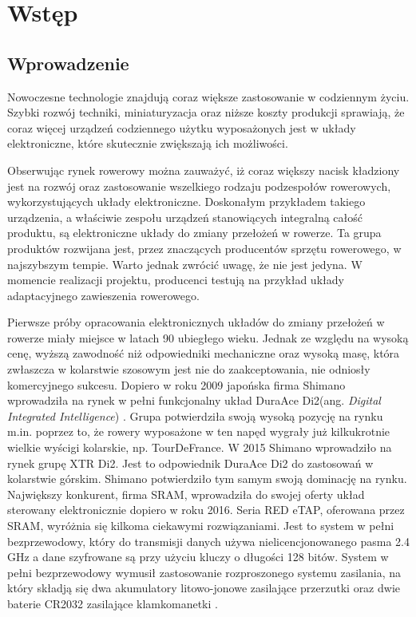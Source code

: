 \chapter{Wstęp}
\label{cha:Wstęp}

\section{Wprowadzenie}
\label{sec:Wprowadzenie}
Nowoczesne technologie znajdują coraz większe zastosowanie w codziennym życiu. Szybki rozwój techniki, miniaturyzacja oraz niższe koszty produkcji sprawiają, że coraz więcej urządzeń codziennego użytku wyposażonych jest w układy elektroniczne, które skutecznie zwiększają ich możliwości. 

Obserwując rynek rowerowy można zauważyć, iż coraz większy nacisk kładziony jest na rozwój oraz zastosowanie wszelkiego rodzaju podzespołów rowerowych, wykorzystujących układy elektroniczne. Doskonałym przykładem takiego urządzenia, a właściwie zespołu urządzeń stanowiących integralną całość produktu, są elektroniczne układy do zmiany przełożeń w rowerze. Ta grupa produktów rozwijana jest, przez znaczących producentów sprzętu rowerowego, w najszybszym tempie. Warto jednak zwrócić uwagę, że nie jest jedyna. W momencie realizacji projektu, producenci testują na przykład układy adaptacyjnego zawieszenia rowerowego.   

Pierwsze próby opracowania elektronicznych układów do zmiany przełożeń w rowerze miały miejsce w latach 90 ubiegłego wieku. Jednak ze względu na wysoką cenę, wyższą zawodność niż odpowiedniki mechaniczne oraz wysoką masę, która zwłaszcza w kolarstwie szosowym jest nie do zaakceptowania, nie odniosły komercyjnego sukcesu. Dopiero w roku 2009 japońska firma Shimano wprowadziła na rynek w pełni funkcjonalny układ DuraAce Di2(ang. {\em Digital Integrated Intelligence}) \cite{shimanoHistory}. Grupa potwierdziła swoją wysoką pozycję na rynku m.in. poprzez to, że rowery wyposażone w ten napęd wygrały już kilkukrotnie wielkie wyścigi kolarskie, np. TourDeFrance. W 2015 Shimano wprowadziło na rynek grupę XTR Di2. Jest to odpowiednik DuraAce Di2 do zastosowań w kolarstwie górskim. Shimano potwierdziło tym samym swoją dominację na rynku. Największy konkurent, firma SRAM, wprowadziła do swojej oferty układ sterowany elektronicznie dopiero w roku 2016. Seria RED eTAP, oferowana przez SRAM, wyróżnia się kilkoma ciekawymi rozwiązaniami. Jest to system w pełni bezprzewodowy, który do transmisji danych używa nielicencjonowanego pasma 2.4 GHz a dane szyfrowane są przy użyciu kluczy o długości 128 bitów. System w pełni bezprzewodowy wymusił zastosowanie rozproszonego systemu zasilania, na który składją się dwa akumulatory litowo-jonowe zasilające przerzutki oraz dwie baterie CR2032 zasilające klamkomanetki \cite{bikeWorld}.

